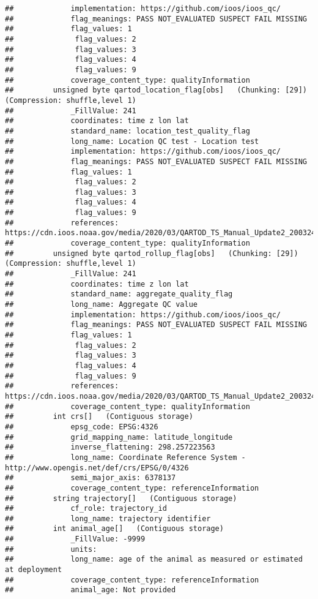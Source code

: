\documentclass[
]{book}
\begin{document}
\begin{verbatim}
##             implementation: https://github.com/ioos/ioos_qc/
##             flag_meanings: PASS NOT_EVALUATED SUSPECT FAIL MISSING
##             flag_values: 1
##              flag_values: 2
##              flag_values: 3
##              flag_values: 4
##              flag_values: 9
##             coverage_content_type: qualityInformation
##         unsigned byte qartod_location_flag[obs]   (Chunking: [29])  (Compression: shuffle,level 1)
##             _FillValue: 241
##             coordinates: time z lon lat
##             standard_name: location_test_quality_flag
##             long_name: Location QC test - Location test
##             implementation: https://github.com/ioos/ioos_qc/
##             flag_meanings: PASS NOT_EVALUATED SUSPECT FAIL MISSING
##             flag_values: 1
##              flag_values: 2
##              flag_values: 3
##              flag_values: 4
##              flag_values: 9
##             references: https://cdn.ioos.noaa.gov/media/2020/03/QARTOD_TS_Manual_Update2_200324_final.pdf
##             coverage_content_type: qualityInformation
##         unsigned byte qartod_rollup_flag[obs]   (Chunking: [29])  (Compression: shuffle,level 1)
##             _FillValue: 241
##             coordinates: time z lon lat
##             standard_name: aggregate_quality_flag
##             long_name: Aggregate QC value
##             implementation: https://github.com/ioos/ioos_qc/
##             flag_meanings: PASS NOT_EVALUATED SUSPECT FAIL MISSING
##             flag_values: 1
##              flag_values: 2
##              flag_values: 3
##              flag_values: 4
##              flag_values: 9
##             references: https://cdn.ioos.noaa.gov/media/2020/03/QARTOD_TS_Manual_Update2_200324_final.pdf
##             coverage_content_type: qualityInformation
##         int crs[]   (Contiguous storage)  
##             epsg_code: EPSG:4326
##             grid_mapping_name: latitude_longitude
##             inverse_flattening: 298.257223563
##             long_name: Coordinate Reference System - http://www.opengis.net/def/crs/EPSG/0/4326
##             semi_major_axis: 6378137
##             coverage_content_type: referenceInformation
##         string trajectory[]   (Contiguous storage)  
##             cf_role: trajectory_id
##             long_name: trajectory identifier
##         int animal_age[]   (Contiguous storage)  
##             _FillValue: -9999
##             units: 
##             long_name: age of the animal as measured or estimated at deployment
##             coverage_content_type: referenceInformation
##             animal_age: Not provided

\end{verbatim}
\end{document}
